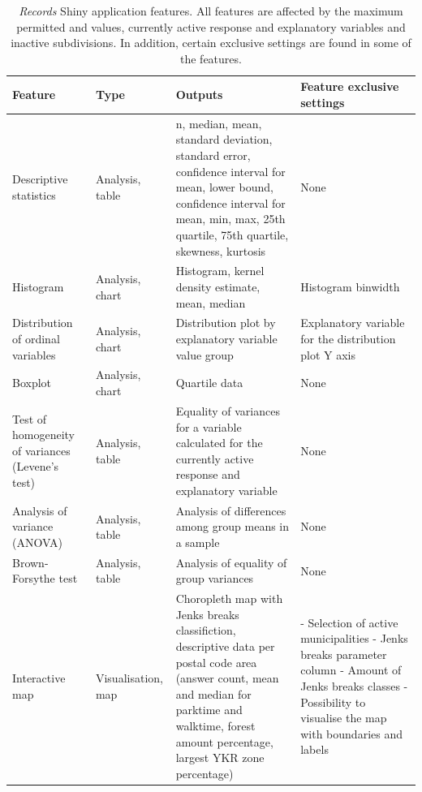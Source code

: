 \begin{table}[H]
    \centering
    \caption[Records Shiny application features]{\textit{Records} Shiny application features. All features are affected by the maximum permitted  and  values, currently active response and explanatory variables and inactive subdivisions. In addition, certain exclusive settings are found in some of the features.}
    \label{tab:records_shiny_features}
    \scalebox{0.8}
    {\def\arraystretch{1.3}
    \setlength\tabcolsep{1.2ex}
    \begin{tabular}{ @{} >{\raggedright\arraybackslash}p{3cm} >{\raggedright\arraybackslash}p{2cm} >{\raggedright\arraybackslash}p{6cm} >{\raggedright\arraybackslash}p{6cm} @{} }
        \toprule
        Feature & Type & Outputs & Feature exclusive settings \\
        \midrule
        1 Descriptive statistics & Analysis, table & n, median, mean, standard deviation, standard error, confidence interval for mean, lower bound, confidence interval for mean, min, max, 25th quartile, 75th quartile, skewness, kurtosis & None \\
        2 Histogram & Analysis, chart & Histogram, kernel density estimate, mean, median & Histogram binwidth \\
        3 Distribution of ordinal variables & Analysis, chart & Distribution plot by explanatory variable value group & Explanatory variable for the distribution plot Y axis \\
        4 Boxplot & Analysis, chart & Quartile data & None \\
        5 Test of homogeneity of variances (Levene's test) & Analysis, table & Equality of variances for a variable calculated for the currently active response and explanatory variable & None \\
        6 Analysis of variance (ANOVA) & Analysis, table & Analysis of differences among group means in a sample & None \\
        7 Brown-Forsythe test & Analysis, table & Analysis of equality of group variances & None \\
        8 Interactive map & Visualisation, map & Choropleth map with Jenks breaks classifiction, descriptive data per postal code area (answer count, mean and median for parktime and walktime, forest amount percentage, largest YKR zone percentage) & - Selection of active municipalities \linebreak - Jenks breaks parameter column \linebreak - Amount of Jenks breaks classes \linebreak - Possibility to visualise the map with boundaries and labels \\
        \bottomrule
    \end{tabular}}
\end{table} 

